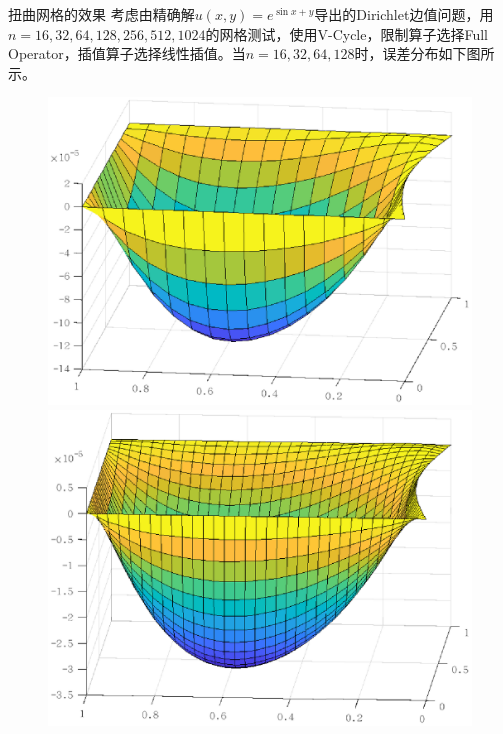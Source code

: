 \documentclass[9pt]{beamer}
\begin{document}
\begin{frame}{扭曲网格的效果}
\small
考虑由精确解$u(x,y)=e^{\sin x+y}$导出的Dirichlet边值问题，用$n=16,32,64,128,256,512,1024$的网格测试，使用V-Cycle，限制算子选择Full Operator，插值算子选择线性插值。当$n=16,32,64,128$时，误差分布如下图所示。
\begin{figure}[H]
  \centering
  \tiny
  \begin{minipage}[t]{0.24\linewidth}
      \centering
      \includegraphics[width=0.95\linewidth]{../report/figure/3-1-1.eps}
  \end{minipage}
  \begin{minipage}[t]{0.24\linewidth}
    \centering
    \includegraphics[width=0.95\linewidth]{../report/figure/3-1-2.eps}
  \end{minipage}
  \begin{minipage}[t]{0.24\linewidth}

\end{minipage}
\end{figure}
\end{frame}
\end{document}
